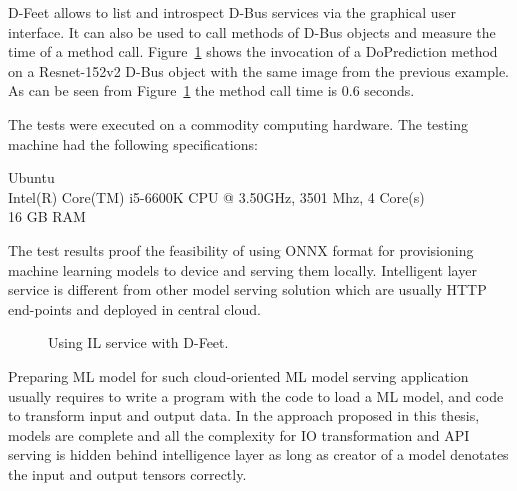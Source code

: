 \documentclass[english, 12pt, a4paper, elec, utf8, online]{aaltothesis}
\begin{document}
D-Feet allows to list and introspect D-Bus services via the graphical user interface. It can also be used to call methods of D-Bus objects and measure the time of a method call. Figure~\ref{fig:dfeet} shows the invocation of a DoPrediction method on a Resnet-152v2 D-Bus object with the same image from the previous example. As can be seen from Figure~\ref{fig:dfeet} the method call time is $0.6$ seconds.    

The tests were executed on a commodity computing hardware. The testing machine had the following specifications:

\begin{center}
Ubuntu \\
Intel(R) Core(TM) i5-6600K CPU @ 3.50GHz, 3501 Mhz, 4 Core(s) \\ 
16 GB RAM
\end{center}
 
The test results proof the feasibility of using ONNX format for provisioning machine learning models to device and serving them locally. Intelligent layer service is different from other model serving solution which are usually HTTP end-points and deployed in central cloud. 

\begin{figure}[h!]
\centering
{}
\caption{Using IL service with D-Feet.}\label{fig:dfeet}
\end{figure}


Preparing ML model for such cloud-oriented ML model serving application usually requires to write a program with the code to load a ML model, and code to transform input and output data. In the approach proposed in this thesis, models are complete and all the complexity for IO transformation and API serving is hidden behind intelligence layer as long as creator of a model denotates the input and output tensors correctly.
\end{document}
